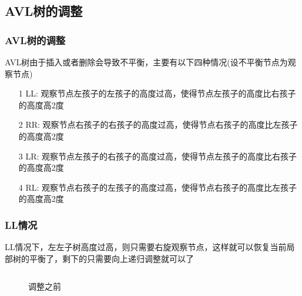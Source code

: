 \documentclass{beamer}
\begin{document}
\begin{CJK}{UTF8}{gbsn}
	\section{AVL树的调整}
	\begin{frame}
		\frametitle{AVL树的调整}
		AVL树由于插入或者删除会导致不平衡，主要有以下四种情况(设不平衡节点为观察节点)
		\begin{itemize}
		 \item[1] LL: 观察节点左孩子的左孩子的高度过高，使得节点左孩子的高度比右孩子的高度高2度 
		 \item[2] RR: 观察节点右孩子的右孩子的高度过高，使得节点右孩子的高度比左孩子的高度高2度 
		 \item[3] LR: 观察节点左孩子的右孩子的高度过高，使得节点左孩子的高度比右孩子的高度高2度 
		 \item[4] RL: 观察节点右孩子的左孩子的高度过高，使得节点右孩子的高度比左孩子的高度高2度 
		\end{itemize}
	\end{frame}

	\begin{frame}
		\frametitle{LL情况}
		LL情况下，左左子树高度过高，则只需要右旋观察节点，这样就可以恢复当前局部树的平衡了，剩下的只需要向上递归调整就可以了
			
		\begin{columns} %

		\pause
		\begin{column}{0.5\textwidth}
		\centering
		\begin{figure}
		{%
		}
		\caption{调整之前}
		\end{figure}
		\end{column}

		\pause
		\begin{column}{0.5\textwidth}
		\centering
		\begin{figure}

		{%
		}


\end{figure}
\end{column}
\end{columns}
\end{frame}
\end{CJK}
\end{document}
